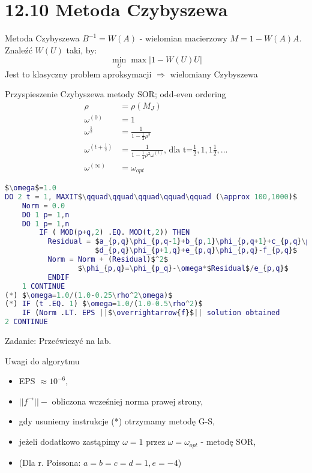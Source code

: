 \section{12.10 Metoda Czybyszewa}

\begin{frame}{Metoda Czybyszewa}
  $B^{-1}=W(A)$ - wielomian macierzowy $M=1-W(A)A$. Znaleźć $W(U)$ taki, by:
  $$\min_{U} {\max{|1-W(U)U|}}$$
  Jest to klasyczny problem aproksymacji $\Rightarrow$ wielomiany Czybyszewa
\end{frame}

\begin{frame}
  \begin{block}{Przyspieszenie Czybyszewa metody SOR; odd-even ordering}
    \begin{align*}
    \rho &= \rho(M_J)\\
    \omega^{(0)}&=1\\
    \omega^{\frac{1}{2}}&=\frac{1}{1-\frac{1}{2}\rho^2}\\
    \omega^{(t+\frac{1}{2})}&=\frac{1}{1-\frac{1}{4}\rho^2\omega^{(t)}}\text{, dla t=}\frac{1}{2},1,1\frac{1}{2},...\\
    \omega^{(\infty)} &= \omega_{opt}
    \end{align*}
  \end{block}
\end{frame}

\begin{frame}[fragile]{}
\begin{lstlisting}[language=Matlab, mathescape]
$\omega$=1.0
DO 2 t = 1, MAXIT$\qquad\qquad\qquad\qquad\qquad (\approx 100,1000)$
    Norm = 0.0
    DO 1 p= 1,n
    DO 1 p= 1,n
        IF ( MOD(p+q,2) .EQ. MOD(t,2)) THEN
          Residual = $a_{p,q}\phi_{p,q-1}+b_{p,1}\phi_{p,q+1}+c_{p,q}\phi_{p-1,q}+$
                     $d_{p,q}\phi_{p+1,q}+e_{p,q}\phi_{p,q}-f_{p,q}$
          Norm = Norm + (Residual)$^2$
                 $\phi_{p,q}=\phi_{p_q}-\omega*$Residual$/e_{p,q}$
          ENDIF
    1 CONTINUE
(*) $\omega=1.0/(1.0-0.25\rho^2\omega)$
(*) IF (t .EQ. 1) $\omega=1.0/(1.0-0.5\rho^2)$
    IF (Norm .LT. EPS ||$\overrightarrow{f}$|| solution obtained
2 CONTINUE
\end{lstlisting}
  \hfill\hfill Zadanie: Przećwiczyć na lab.
\end{frame}

\begin{frame}{}
  \begin{block}{Uwagi do algorytmu}
    \begin{itemize}
      \item EPS $\approx 10^{-6}$,
      \item $||f^\rightarrow|| -$ obliczona wcześniej norma prawej strony,
      \item gdy usuniemy instrukcje (*) otrzymamy metodę G-S,
      \item jeżeli dodatkowo zastąpimy $\omega=1$ przez $\omega=\omega_{opt}$ - metodę SOR,
      \item (Dla r. Poissona: $a=b=c=d=1, e=-4$)
    \end{itemize}
  \end{block}
\end{frame}

